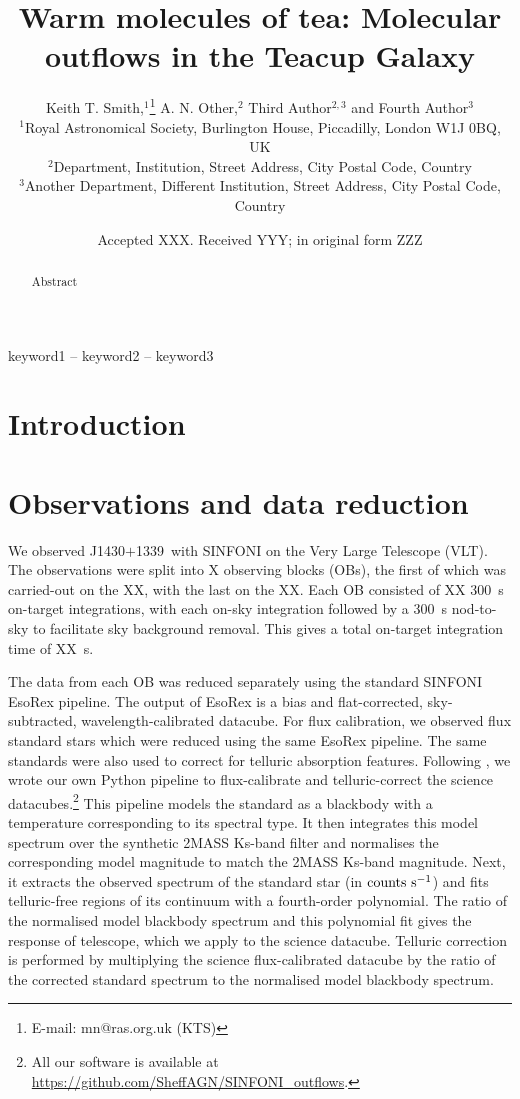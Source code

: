 \documentclass[a4paper,fleqn,usenatbib]{mnras}
\title[Warm molecules of tea]{Warm molecules of tea: Molecular outflows in the Teacup Galaxy}
\author[K. T. Smith et al.]{
Keith T. Smith,$^{1}$\thanks{E-mail: mn@ras.org.uk (KTS)}
A. N. Other,$^{2}$
Third Author$^{2,3}$
and Fourth Author$^{3}$
\\
$^{1}$Royal Astronomical Society, Burlington House, Piccadilly, London W1J 0BQ, UK\\
$^{2}$Department, Institution, Street Address, City Postal Code, Country\\
$^{3}$Another Department, Different Institution, Street Address, City Postal Code, Country
}
\date{Accepted XXX. Received YYY; in original form ZZZ}
\newcommand{\jf}{J1430$+$1339}
\begin{document}
\label{firstpage}
\pagerange{\pageref{firstpage}--\pageref{lastpage}}
\maketitle

\begin{abstract}
Abstract
\end{abstract}

\begin{keywords}
keyword1 -- keyword2 -- keyword3
\end{keywords}



\section{Introduction}

\section{Observations and data reduction}

We observed \jf\ with SINFONI on the Very Large Telescope (VLT). The observations were split into X observing blocks (OBs), the first of which was carried-out on the XX, with the last on the XX. Each OB consisted of XX 300~s on-target integrations, with each on-sky integration followed by a 300~s nod-to-sky to facilitate sky background removal. This gives a total on-target integration time of XX~s.

The data from each OB was reduced separately using the standard SINFONI EsoRex pipeline. The output of EsoRex is a bias and flat-corrected, sky-subtracted, wavelength-calibrated datacube. For flux calibration, we observed flux standard stars which were reduced using the same EsoRex pipeline. The same standards were also used to correct for telluric absorption features. Following \cite{Ramos-Almeida17}, we wrote our own Python pipeline to flux-calibrate and telluric-correct the science datacubes.\footnote{All our software is available at \url{https://github.com/SheffAGN/SINFONI_outflows}.} This pipeline models the standard as a blackbody with a temperature corresponding to its spectral type. It then integrates this model spectrum over the synthetic 2MASS Ks-band filter and normalises the corresponding model magnitude to match the 2MASS Ks-band magnitude. Next, it extracts the observed spectrum of the standard star (in ${\rm counts~s^{-1}}$) and fits telluric-free regions of its continuum with a fourth-order polynomial. The ratio of the normalised model blackbody spectrum and this polynomial fit gives the response of telescope, which we apply to the science datacube. Telluric correction is performed by multiplying the science flux-calibrated datacube by the ratio of the corrected standard spectrum to the normalised model blackbody spectrum.
   
\end{document}
